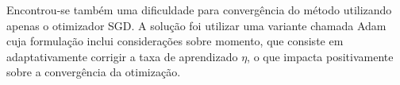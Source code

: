 Encontrou-se também uma dificuldade para convergência do método utilizando apenas o otimizador SGD. A solução foi utilizar uma variante chamada Adam cuja formulação inclui considerações sobre momento, que consiste em adaptativamente corrigir a taxa de aprendizado $\eta$, o que impacta positivamente sobre a convergência da otimização.

